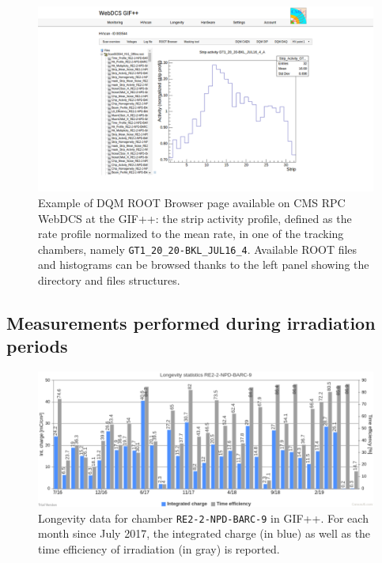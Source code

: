 	\begin{figure}[H]
        \centering
		\includegraphics[width = \linewidth]{fig/chapt5/GIFpp-ROOT-browser.png}
		\caption{\label{fig:DQM-ROOT} Example of DQM ROOT Browser page available on CMS RPC WebDCS at the GIF++: the strip activity profile, defined as the rate profile normalized to the mean rate, in one of the tracking chambers, namely \texttt{GT1\_20\_20-BKL\_JUL16\_4}. Available ROOT files and histograms can be browsed thanks to the left panel showing the directory and files structures.}
	\end{figure}

	\subsection{Measurements performed during irradiation periods}
	\label{chapt5:ssec:irradiation}

	\begin{figure}[H]
        \centering
		\includegraphics[width = \linewidth]{fig/chapt5/GIFpp-irradiation-statistics.png}
		\caption{\label{fig:Irr-stat} Longevity data for chamber \texttt{RE2-2-NPD-BARC-9} in GIF++. For each month since July 2017, the integrated charge (in blue) as well as the time efficiency of irradiation (in gray) is reported.}
	\end{figure}
	
